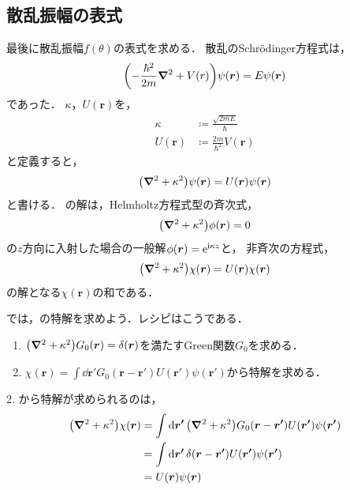 \documentclass{report}
\begin{document}
  \subsection{散乱振幅の表式}
    最後に散乱振幅$f(\theta)$の表式を求める．
    散乱のSchrödinger方程式は，
    \begin{align}
      \qty(-\frac{\hbar^2}{2m}\grad^2 + V(r))\psi(\bm{r}) = E\psi(\bm{r})
    \end{align}
    であった．
    $\kappa$，$U(\bm{r})$を，
    \begin{align}
        \kappa &\coloneqq \frac{\sqrt{2mE}}{\hbar} \label{kappa-def}\\
        U(\bm{r}) &\coloneqq \frac{2m}{\hbar^2} V(\bm{r})
    \end{align}
    と定義すると，
    \begin{align}
      \qty(\grad^2 + \kappa^2)\psi(\bm{r}) = U(\bm{r}) \psi(\bm{r}) \label{helmholtz-eq}
    \end{align}
    と書ける．
    の解は，Helmholtz方程式型の斉次式，
    \begin{align}
      \qty(\grad^2 + \kappa^2)\phi(\bm{r}) = 0
    \end{align}
    の$z$方向に入射した場合の一般解$\phi(\bm{r}) = \mathrm{e}^{\mathrm{i} \kappa z}$と，
    非斉次の方程式，
    \begin{align}
      \qty(\grad^2 + \kappa^2)\chi(\bm{r}) = U(\bm{r}) \chi(\bm{r})\label{particular-solution}
    \end{align}
    の解となる$\chi(\bm{r})$の和である．
    \par
    では，の特解を求めよう．レシピはこうである．
    \begin{enumerate}
      \item $\qty(\grad^2 + \kappa^2)G_0(\bm{r}) = \delta(\bm{r})$を満たすGreen関数$G_0$を求める．
      \item $\chi(\bm{r}) = \int\dd{\bm{r'}} G_0(\bm{r} - \bm{r'}) U(\bm{r'}) \psi(\bm{r'})$から特解を求める．
    \end{enumerate}
    2. から特解が求められるのは，
    \begin{align}
      \qty(\grad^2 + \kappa^2)\chi(\bm{r}) &= \int \dd{\bm{r'}}\qty(\grad^2 + \kappa^2)G_0(\bm{r} - \bm{r'}) U(\bm{r'}) \psi(\bm{r'}) \\
      &= \int\dd{\bm{r'}} \delta(\bm{r} - \bm{r'}) U(\bm{r'}) \psi(\bm{r'}) \\
      &= U(\bm{r}) \psi(\bm{r})
    \end{align}
\end{document}
